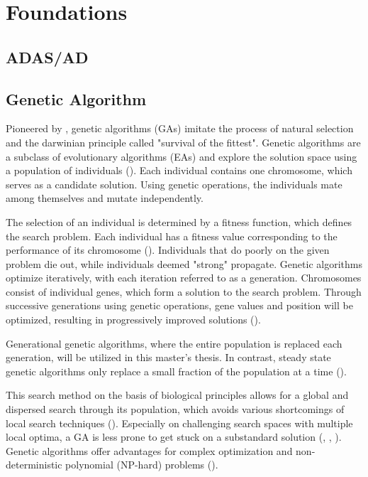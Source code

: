 \chapter{Foundations}
\label{chap:foundations}

\section{ADAS/AD}


\section{Genetic Algorithm}
\label{sect:foundations:genetic_algorithm}

Pioneered by \cite{holland_adaptation_1992}, genetic algorithms (GAs) imitate the process of natural selection and the darwinian principle called "survival of the fittest". Genetic algorithms are a subclass of evolutionary algorithms (EAs) and explore the solution space using a population of individuals (\cite{mills_determining_2015}). Each individual contains one chromosome, which serves as a candidate solution. Using genetic operations, the individuals mate among themselves and mutate independently. 

The selection of an individual is determined by a fitness function, which defines the search problem. Each individual has a fitness value corresponding to the performance of its chromosome (\cite{majumdar_genetic_2015}). Individuals that do poorly on the given problem die out, while individuals deemed "strong" propagate. Genetic algorithms optimize iteratively, with each iteration referred to as a generation. Chromosomes consist of individual genes, which form a solution to the search problem. Through successive generations using genetic operations, gene values and position will be optimized, resulting in progressively improved solutions (\cite{srinivas_genetic_1994}).

Generational genetic algorithms, where the entire population is replaced each generation, will be utilized in this master's thesis. In contrast, steady state genetic algorithms only replace a small fraction of the population at a time (\cite{srinivas_genetic_1994}).

This search method on the basis of biological principles allows for a global and dispersed search through its population, which avoids various shortcomings of local search techniques (\cite{grefenstette_optimization_1986}). Especially on challenging search spaces with multiple local optima, a GA is less prone to get stuck on a substandard solution (\cite{katoch_review_2021}, \cite{xia_genetic_2019}, \cite{majumdar_genetic_2015}). Genetic algorithms offer advantages for complex optimization and non-deterministic polynomial (NP-hard) problems (\cite{hussain_trade-off_2020}).

